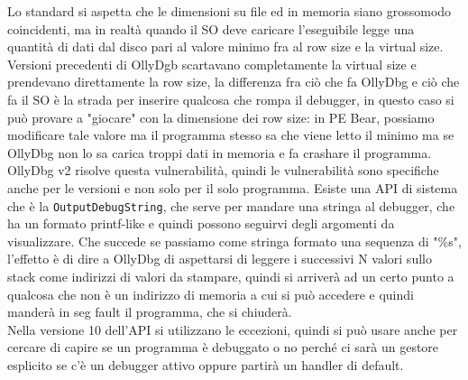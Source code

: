\documentclass[12pt, oneside]{extbook}
\begin{document}
Lo standard si aspetta che le dimensioni su file ed in memoria siano grossomodo coincidenti, ma in realtà quando il SO deve caricare l'eseguibile legge una quantità di dati dal disco pari al valore minimo fra al row size e la virtual size.\\Versioni precedenti di OllyDgb scartavano completamente la virtual size e prendevano direttamente la row size, la differenza fra ciò che fa OllyDbg e ciò che fa il SO è la strada per inserire qualcosa che rompa il debugger, in questo caso si può provare a "giocare" con la dimensione dei row size:  in PE Bear, possiamo modificare tale valore ma il programma stesso sa che viene letto il minimo ma se OllyDbg non lo sa carica troppi dati in memoria e fa crashare il programma.
OllyDbg v2 risolve questa vulnerabilità, quindi le vulnerabilità sono specifiche anche per le versioni e non solo per il solo programma. Esiste una API di sistema che è la \texttt{OutputDebugString}, che serve per mandare una stringa al debugger, che ha un formato printf-like e quindi possono seguirvi degli argomenti da visualizzare. Che succede se passiamo come stringa formato una sequenza di "\%s", l'effetto è di dire a OllyDbg di aspettarsi di leggere i successivi N valori sullo stack come indirizzi di valori da stampare, quindi si arriverà ad un certo punto a qualcosa che non è un indirizzo di memoria a cui si può accedere e quindi manderà in seg fault il programma, che si chiuderà.\\Nella versione 10 dell'API si utilizzano le eccezioni, quindi si può usare anche per cercare di capire se un programma è debuggato o no perché ci sarà un gestore esplicito se c'è un debugger attivo oppure partirà un handler di default.
\end{document}
